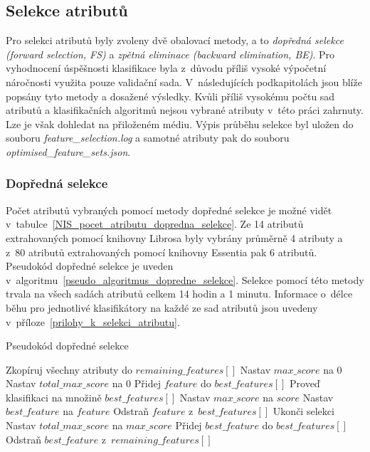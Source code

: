 \subsection*{Selekce atributů}
\label{NIS_selekce_atributu}
Pro selekci atributů byly zvoleny dvě obalovací metody, a to \textit{dopředná selekce (forward selection, FS)} a \textit{zpětná eliminace (backward elimination, BE)}. Pro vyhodnocení úspěšnosti klasifikace byla z~důvodu příliš vysoké výpočetní náročnosti využita pouze validační sada. V~následujících podkapitolách jsou blíže popsány tyto metody a dosažené výsledky. Kvůli příliš vysokému počtu sad atributů a klasifikačních algoritmů nejsou vybrané atributy v~této práci zahrnuty. Lze je však dohledat na přiloženém médiu. Výpis průběhu selekce byl uložen do souboru \textit{feature\_selection.log} a samotné atributy pak do souboru \textit{optimised\_feature\_sets.json}.

\subsubsection*{Dopředná selekce}
\label{NIS_dopredna_selekce}
Počet atributů vybraných pomocí metody dopředné selekce je možné vidět v~tabulce~\ref{NIS_pocet_atributu_dopredna_selekce}. Ze 14 atributů extrahovaných pomocí knihovny Librosa byly vybrány průměrně 4 atributy a z~80 atributů extrahovaných pomocí knihovny Essentia pak 6 atributů. Pseudokód dopředné selekce je uveden v~algoritmu~\ref{pseudo_algoritmus_dopredne_selekce}. Selekce pomocí této metody trvala na všech sadách atributů celkem 14 hodin a 1 minutu. Informace o~délce běhu pro jednotlivé klasifikátory na každé ze sad atributů jsou uvedeny v~příloze~\ref{prilohy_k_selekci_atributu}.

\begin{algorithm}
    \caption{Pseudokód dopředné selekce}
    \label{pseudo_algoritmus_dopredne_selekce}
    \begin{algorithmic}[1]
        \State Zkopíruj všechny atributy do $remaining\_features[]$
        \State Nastav $max\_score$ na $0$
        \State Nastav $total\_max\_score$ na $0$
                \State Přidej $feature$ do $best\_features[]$
                \State Proveď klasifikaci na množině $best\_features[]$
                    \State Nastav $max\_score$ na $score$
                    \State Nastav $best\_feature$ na $feature$
                \EndIf
                \State Odstraň $feature$ z~$best\_features[]$
            \EndFor
                \State Ukonči selekci
            \EndIf
            \State Nastav $total\_max\_score$ na $max\_score$
            \State Přidej $best\_feature$ do $best\_features[]$
            \State Odstraň $best\_feature$ z~$remaining\_features[]$
        \EndWhile
    \end{algorithmic}
\end{algorithm}


